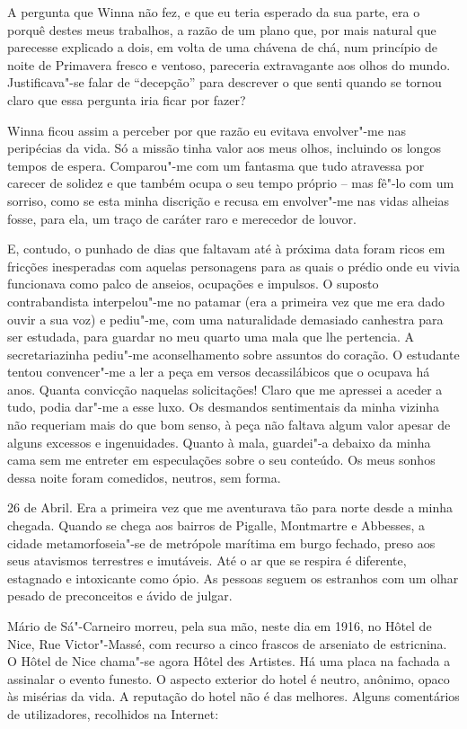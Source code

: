 A pergunta que Winna não fez, e que eu teria esperado da sua parte, era
o porquê destes meus trabalhos, a razão de um plano que, por mais
natural que parecesse explicado a dois, em volta de uma chávena de chá,
num princípio de noite de Primavera fresco e ventoso, pareceria
extravagante aos olhos do mundo. Justificava"-se falar de ``decepção''
para descrever o que senti quando se tornou claro que essa pergunta iria
ficar por fazer?

Winna ficou assim a perceber por que razão eu evitava envolver"-me nas
peripécias da vida. Só a missão tinha valor aos meus olhos, incluindo os
longos tempos de espera. Comparou"-me com um fantasma que tudo
atravessa por carecer de solidez e que também ocupa o seu tempo próprio
-- mas fê"-lo com um sorriso, como se esta minha discrição e recusa em
envolver"-me nas vidas alheias fosse, para ela, um traço de caráter raro
e merecedor de louvor.

E, contudo, o punhado de dias que faltavam até à próxima data foram
ricos em fricções inesperadas com aquelas personagens para as quais o
prédio onde eu vivia funcionava como
palco de anseios, ocupações e impulsos. O suposto contrabandista
interpelou"-me no patamar (era a primeira vez que me era dado ouvir a sua
voz) e pediu"-me, com uma naturalidade demasiado canhestra para ser
estudada, para guardar no meu quarto uma mala que lhe pertencia. A
secretariazinha pediu"-me aconselhamento sobre assuntos do coração. O estudante tentou
convencer"-me a ler a peça em versos decassilábicos que o ocupava há
anos. Quanta convicção naquelas solicitações! Claro que me apressei a
aceder a tudo, podia dar"-me a esse luxo. Os desmandos sentimentais da
minha vizinha não requeriam mais do que bom senso, à peça não faltava
algum valor apesar de alguns excessos e ingenuidades. Quanto à mala,
guardei"-a debaixo da minha cama sem me entreter em especulações sobre o
seu conteúdo. Os meus sonhos dessa noite foram comedidos, neutros, sem
forma.

26 de Abril. Era a primeira vez que me aventurava tão para norte desde a
minha chegada. Quando se chega aos bairros de Pigalle, Montmartre e
Abbesses, a cidade metamorfoseia"-se de metrópole marítima em burgo
fechado, preso aos seus atavismos terrestres e imutáveis. Até o ar que
se respira é diferente, estagnado e intoxicante como ópio. As pessoas
seguem os estranhos com um olhar pesado de preconceitos e ávido de
julgar.

Mário de Sá"-Carneiro morreu, pela sua mão, neste dia em 1916, no Hôtel
de Nice, Rue Victor"-Massé, com recurso a cinco frascos de arseniato de
estricnina. O Hôtel de Nice chama"-se agora Hôtel des Artistes. Há uma
placa na fachada a assinalar o evento funesto. O aspecto exterior do
hotel é neutro, anônimo, opaco às misérias da vida. A reputação do hotel
não é das melhores. Alguns comentários de utilizadores, recolhidos na
Internet:


